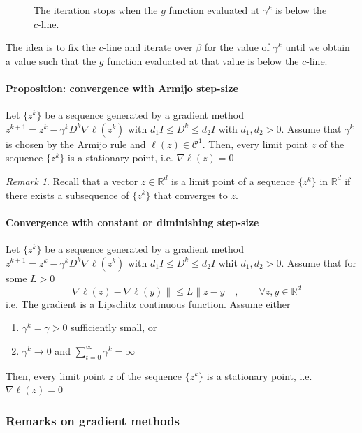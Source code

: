 \documentclass[openany]{book}
\newcommand{\R}{\mathbb{R}}               %
\theoremstyle{definition}
\theoremstyle{remark}
\newtheorem*{remark}{Remark}
\begin{document}
\begin{figure}[ht]
\begin{minipage}{.33\textwidth}
    \end{minipage}%
    \caption{The iteration stops when the $g$ function evaluated at $\gamma^k$ is below the $c$-line.}
\end{figure}

The idea is to fix the $c$-line and iterate over $\beta$ for the value of $\gamma^k$ until we obtain a value such that the $g$ function evaluated at that value is below the $c$-line.

\paragraph{Proposition: convergence with Armijo step-size}

Let $\{z^k\}$ be a sequence generated by a gradient method $z^{k+1}=z^k-\gamma^kD^k\nabla\ell(z^k)$ with $d_1I\leq D^k \leq d_2I$ with $d_1,d_2>0$. 
Assume that $\gamma^k$ is chosen by the Armijo rule and $\ell(z)\in \mathcal{C}^1$. Then, every limit point $\bar{z}$ of the sequence $\{z^k\}$ is a stationary point, i.e. $\nabla\ell(\bar{z})=0$
\begin{remark}
Recall that a vector $z\in\R^d$ is a limit point of a sequence $\{z^k\}$ in $\R^d$ if there exists a subsequence of $\{z^k\}$ that converges to $z$.
\end{remark}

\paragraph{Convergence with constant or diminishing step-size}

Let $\{z^k\}$ be a sequence generated by a gradient method $z^{k+1}=z^k-\gamma^kD^k\nabla\ell(z^k)$ with $d_1I\leq D^k \leq d_2I$ whit $d_1,d_2>0$. Assume that for some $L>0$ 
\[
    \|\nabla\ell(z)-\nabla\ell(y)\|\leq L\|z-y\|, \qquad \forall z,y\in\R^d
\]
i.e. The gradient is a Lipschitz continuous function.
Assume either
\begin{enumerate}
    \item $\gamma^k=\gamma>0$ sufficiently small, or 
    \item $\gamma^k\to 0$ and $\displaystyle\sum_{t=0}^{\infty}\gamma^k=\infty$
\end{enumerate}
Then, every limit point $\bar{z}$ of the sequence $\{z^k\}$ is a stationary point, i.e. $\nabla\ell(\bar{z})=0$

\subsubsection{Remarks on gradient methods}
\end{document}
